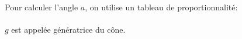 
Pour calculer l'angle $a$, on utilise un tableau de proportionnalité:
\\%
\\ $g$ est appelée \og génératrice \fg{} du cône.